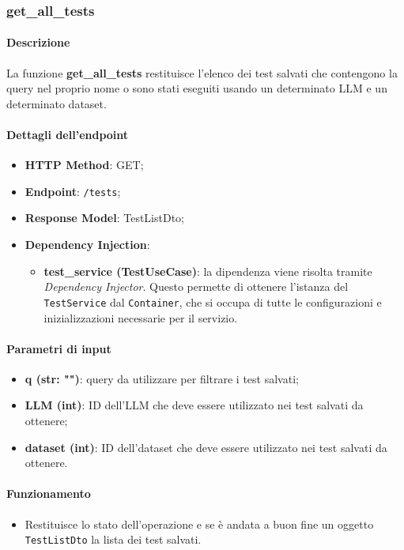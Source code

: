 \subsubsection{get\_all\_tests}
\label{subsubsec:get_all_tests}

\paragraph{Descrizione}
La funzione \textbf{get\_all\_tests} restituisce l'elenco dei test salvati che contengono la query nel proprio nome o sono stati eseguiti usando un determinato LLM e un determinato dataset.

\paragraph{Dettagli dell'endpoint}
\begin{itemize}
    \item \textbf{HTTP Method}: GET;
    \item \textbf{Endpoint}: \texttt{/tests};
    \item \textbf{Response Model}: TestListDto;
    \item \textbf{Dependency Injection}: 
    \begin{itemize}
        \item \textbf{test\_service (TestUseCase)}: la dipendenza viene risolta tramite \textit{Dependency Injector}. Questo permette di ottenere l'istanza del \texttt{TestService} dal \texttt{Container}, che si occupa di tutte le configurazioni e inizializzazioni necessarie per il servizio.
    \end{itemize}
\end{itemize}

\paragraph{Parametri di input}
\begin{itemize}
    \item \textbf{q (str: "")}: query da utilizzare per filtrare i test salvati;
    \item \textbf{LLM (int)}: ID dell'LLM che deve essere utilizzato nei test salvati da ottenere;
    \item \textbf{dataset (int)}: ID dell'dataset che deve essere utilizzato nei test salvati da ottenere.
\end{itemize}

\paragraph{Funzionamento}
\begin{itemize}
    \item Restituisce lo stato dell'operazione e se è andata a buon fine un oggetto \texttt{TestListDto} la lista dei test salvati.
\end{itemize}

